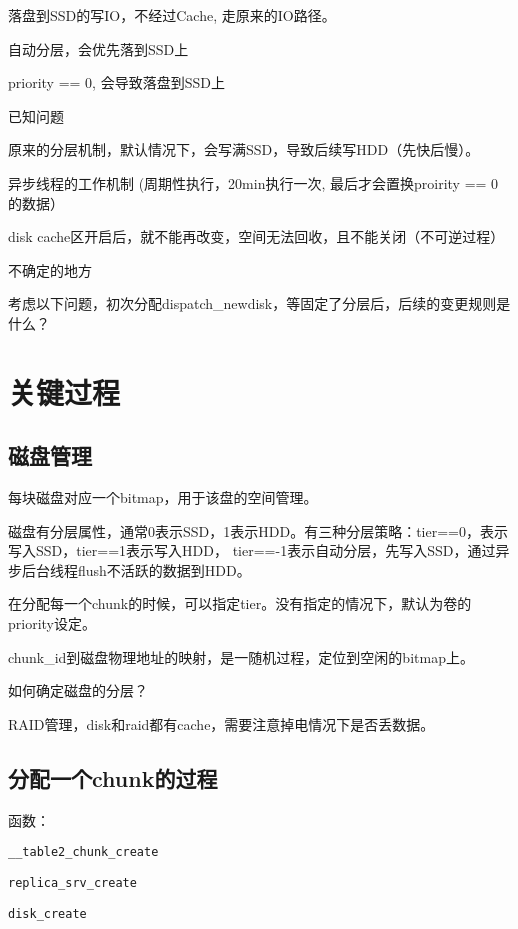 落盘到SSD的写IO，不经过Cache, 走原来的IO路径。
\begin{compactenum}
\item 自动分层，会优先落到SSD上
\item priority == 0, 会导致落盘到SSD上
\end{compactenum}

已知问题

\begin{compactenum}
\item 原来的分层机制，默认情况下，会写满SSD，导致后续写HDD（先快后慢）。
\item 异步线程的工作机制 (周期性执行，20min执行一次, 最后才会置换proirity == 0的数据）
\item disk cache区开启后，就不能再改变，空间无法回收，且不能关闭（不可逆过程）
\end{compactenum}

不确定的地方

考虑以下问题，初次分配dispatch\_newdisk，等固定了分层后，后续的变更规则是什么？

\section{关键过程}

\subsection{磁盘管理}

每块磁盘对应一个bitmap，用于该盘的空间管理。

磁盘有分层属性，通常0表示SSD，1表示HDD。有三种分层策略：tier==0，表示写入SSD，tier==1表示写入HDD，
tier==-1表示自动分层，先写入SSD，通过异步后台线程flush不活跃的数据到HDD。

在分配每一个chunk的时候，可以指定tier。没有指定的情况下，默认为卷的priority设定。

chunk\_id到磁盘物理地址的映射，是一随机过程，定位到空闲的bitmap上。

如何确定磁盘的分层？

RAID管理，disk和raid都有cache，需要注意掉电情况下是否丢数据。

\subsection{分配一个chunk的过程}

函数：
\begin{compactitem}
\item \verb|__table2_chunk_create|
\item \verb|replica_srv_create|
\item \verb|disk_create|
\end{compactitem}

